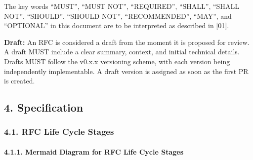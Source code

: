 The key words ``MUST'', ``MUST NOT'', ``REQUIRED'', ``SHALL'', ``SHALL
NOT'', ``SHOULD'', ``SHOULD NOT'', ``RECOMMENDED'', ``MAY'', and
``OPTIONAL'' in this document are to be interpreted as described in
{[}01{]}.

\textbf{Draft:} An RFC is considered a draft from the moment it is
proposed for review. A draft MUST include a clear summary, context, and
initial technical details. Drafts MUST follow the v0.x.x versioning
scheme, with each version being independently implementable. A draft
version is assigned as soon as the first PR is created.

\subsection{4. Specification}\label{specification}

\subsubsection{4.1. RFC Life Cycle Stages}\label{rfc-life-cycle-stages}

\paragraph{\texorpdfstring{4.1.1. \textbf{Mermaid Diagram for RFC Life
Cycle
Stages}}{4.1.1. Mermaid Diagram for RFC Life Cycle Stages}}\label{mermaid-diagram-for-rfc-life-cycle-stages}

\begin{Shaded}
\begin{Highlighting}[]
\NormalTok{    A["\textasciigrave{}**Raw**}
\NormalTok{      Initial unstructured ideas\textasciigrave{}"]}
\NormalTok{    B["\textasciigrave{}**Discussion**}
\NormalTok{      Collaborative refinement with feedback\textasciigrave{}"]}
\NormalTok{    C["\textasciigrave{}**Review**}
\NormalTok{      Focused evaluation to assess feasibility\textasciigrave{}"]}
\NormalTok{    D["\textasciigrave{}**Draft** (v0.x.x)}
\NormalTok{      Structured proposal ready for development, each version independently implementable\textasciigrave{}"]}
\NormalTok{    E["\textasciigrave{}**Implementation**}
\NormalTok{      PR Merge\textasciigrave{}"]}
\NormalTok{    F["\textasciigrave{}**Finalized** (v1.0.0)}
\NormalTok{      Stable and complete RFC\textasciigrave{}"]}
\NormalTok{    G["\textasciigrave{}**Errata** (v1.0.x)}
\NormalTok{      Minor technical corrections post{-}finalization\textasciigrave{}"]}
\NormalTok{    H["\textasciigrave{}**Superseded**}
\NormalTok{      New RFC required for significant updates\textasciigrave{}"]}
\NormalTok{    I["\textasciigrave{}**Rejected**}
\NormalTok{      Documented reasons for rejection\textasciigrave{}"]}

\end{Highlighting}
\end{Shaded}


